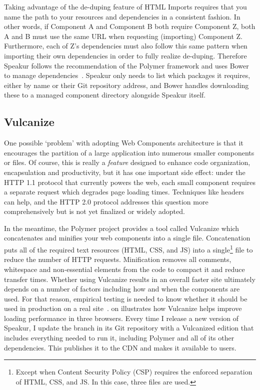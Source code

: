 Taking advantage of the de-duping feature of HTML Imports
requires that you name the path to your resources and dependencies in a consistent fashion.
In other words, if Component A and Component B both require Component Z, both A and B must use the same URL when requesting (importing) Component Z.
Furthermore, each of Z's dependencies must also follow this same pattern when importing their own dependencies in order to fully realize de-duping.
Therefore Speakur follows the recommendation of the Polymer framework and uses Bower to manage dependencies~\cite{bowercontributors2015}. 
Speakur only needs to list which packages it requires, either by name or their Git repository address, 
and Bower handles downloading these to a managed component directory alongside Speakur itself.

\subsection{Vulcanize}
One possible `problem' with adopting Web Components architecture is that it encourages the partition of a large application into numerous smaller components or files.
Of course, this is really a \textit{feature} designed to enhance code organization, encapsulation and productivity, 
but it has one important side effect: 
under the HTTP 1.1 protocol that currently powers the web, each small component requires a separate request which degrades page loading times.
Techniques like  headers can help, and the HTTP 2.0 protocol addresses this question more comprehensively but is not yet finalized or widely adopted.

In the meantime, the Polymer project provides a tool called Vulcanize which concatenates and minifies your web components into a single file.
Concatenation puts all of the required text resources (HTML, CSS, and JS) into a 
single\footnote{Except when Content Security Policy (CSP) requires the enforced separation of HTML, CSS, and JS. In this case, three files are used.}
file to reduce the number of HTTP requests.
Minification removes all comments, whitespace and non-essential elements from the code to compact it and reduce transfer times.
Whether using Vulcanize results in an overall faster site ultimately depends on a number of factors including how and when the components are used.
For that reason, empirical testing is needed to know whether it should be used in production on a real site~\cite{polymercontributors2015-a}.
 on  illustrates how Vulcanize helps improve loading performance in three browsers.
Every time I release a new version of Speakur, I update the  branch in its Git repository with a Vulcanized edition that includes everything needed to run it, including Polymer and all of its other dependencies.
This publishes it to the  CDN and makes it available to users.
